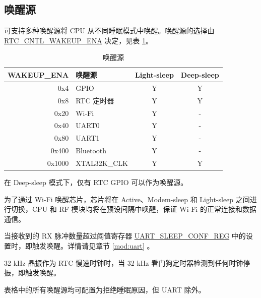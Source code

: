 \documentclass[main\_\_CN.tex]{subfiles}
\begin{document}
\subsection{唤醒源}\label{sec:lpm-wakeup-source}

\chipname{} 可支持多种唤醒源将 CPU 从不同睡眠模式中唤醒。唤醒源的选择由 \hyperref[fielddesc:RTCCNTLWAKEUPENA]{RTC\_CNTL\_WAKEUP\_ENA} 决定，见表 \ref{tab:lpm-wakeup-source}。

\begin{table}[H]
    \centering
    \caption{唤醒源}
    \label{tab:lpm-wakeup-source}
    \begin{threeparttable}
    \begin{tabular}{| r | l | c | c |} 
    \hline
    \rowcolor{lightgray}
    \textbf{WAKEUP\_ENA} & \textbf{唤醒源\tnote{5}} &  \textbf{Light-sleep} & \textbf{Deep-sleep}  \\\hline
    0x4 & GPIO\tnote{1} & Y & Y \\\hline
    0x8 & RTC 定时器 & Y & Y \\\hline
    0x20 & Wi-Fi\tnote{2} & Y & - \\\hline
    0x40 & UART0\tnote{3} & Y & - \\\hline
    0x80 & UART1\tnote{3} & Y & - \\\hline
    0x400 & Bluetooth & Y & - \\\hline
    0x1000 & XTAL32K\_CLK\tnote{4} & Y & Y \\\hline
    \end{tabular}
    \begin{tablenotes}
        \item[1] 在 Deep-sleep 模式下，仅有 RTC GPIO 可以作为唤醒源。
        \item[2] 为了通过 Wi-Fi 唤醒芯片，芯片将在 Active、Modem-sleep 和 Light-sleep 之间进行切换，CPU 和 RF 模块均将在预设间隔中唤醒，保证 Wi-Fi 的正常连接和数据通信。
        \item[3] 当接收到的 RX 脉冲数量超过阈值寄存器 \hyperref[regdesc:UARTSLEEPCONFREG]{UART\_SLEEP\_CONF\_REG} 中的设置时，即触发唤醒。详情请见章节 \ref{mod:uart} \textit{}。
        \item[4] 32 kHz 晶振作为 RTC 慢速时钟时，当 32 kHz 看门狗定时器检测到任何时钟停振，即触发唤醒。
        \item[5] 表格中的所有唤醒源均可配置为拒绝睡眠原因，但 UART 除外。
    \end{tablenotes}
    \end{threeparttable}
\end{table}
\end{document}
